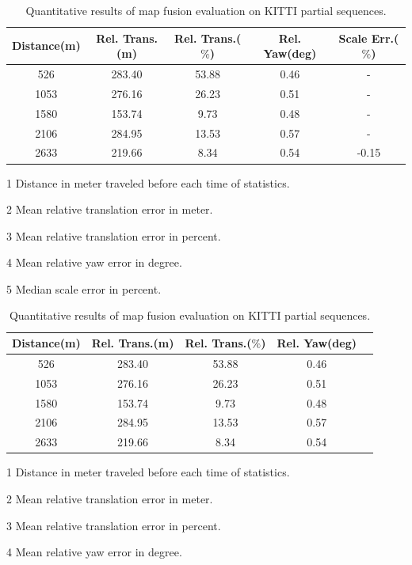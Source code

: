 \begin{table}
	\centering
	\caption{Quantitative results of map fusion evaluation on KITTI partial sequences.}
	\begin{threeparttable}
	\ifoutputscaleerror
	\begin{tabular}{|c|c|c|c|c|}
		\hline
		Distance(m)\tnote{1} & Rel. Trans.(m)\tnote{2}  & Rel. Trans.($\%$)\tnote{3} & Rel. Yaw(deg)\tnote{4} & Scale Err.($\%$)\tnote{5}  \\
		\hline
		526& 283.40 & 53.88 & 0.46& - \\
		\hline
		1053&276.16& 26.23 & 0.51 & - \\
		\hline
		1580&153.74& 9.73 & 0.48 & - \\
		\hline
		2106&284.95& 13.53 & 0.57 & - \\
		\hline
		2633&219.66& 8.34 & 0.54 & -0.15\\
		\hline
	\end{tabular}
      \begin{tablenotes}
		\footnotesize
		\item[1] Distance in meter traveled before each time of statistics. 
		\item[2] Mean relative translation error in meter.
		\item[3] Mean relative translation error in percent.
		\item[4] Mean relative yaw error in degree.
		\item[5] Median scale error in percent.
	\end{tablenotes}
\fi

	\begin{tabular}{|c|c|c|c|c|}
	\hline
	Distance(m)\tnote{1} & Rel. Trans.(m)\tnote{2}  & Rel. Trans.($\%$)\tnote{3} & Rel. Yaw(deg)\tnote{4} \\
	\hline
	526& 283.40 & 53.88 & 0.46 \\
	\hline
	1053&276.16& 26.23 & 0.51  \\
	\hline
	1580&153.74& 9.73 & 0.48  \\
	\hline
	2106&284.95& 13.53 & 0.57  \\
	\hline
	2633&219.66& 8.34 & 0.54 \\
	\hline
\end{tabular}
\begin{tablenotes}
	\footnotesize
	\item[1] Distance in meter traveled before each time of statistics. 
	\item[2] Mean relative translation error in meter.
	\item[3] Mean relative translation error in percent.
	\item[4] Mean relative yaw error in degree.
\end{tablenotes}


	\end{threeparttable}
	\label{tbl:kittiquanresult}
\end{table}